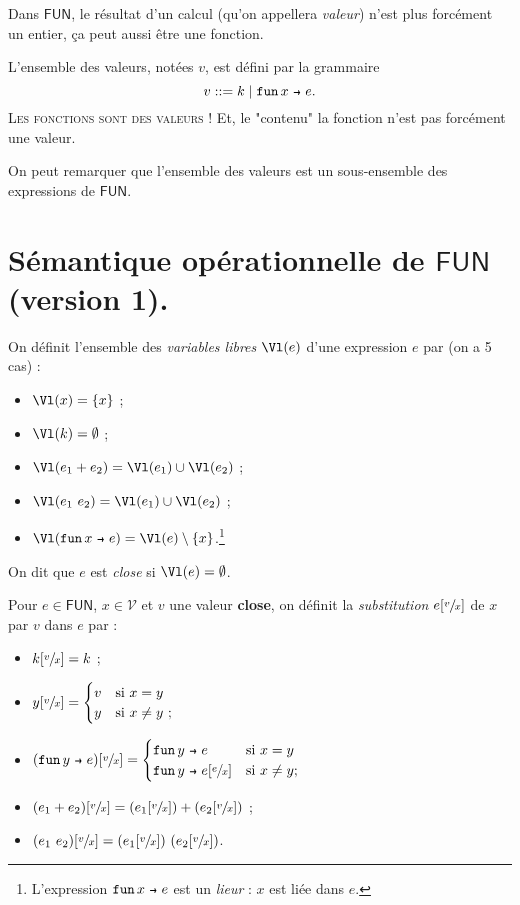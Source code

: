 \documentclass[../main]{subfiles}
\begin{document}
  \begin{rmk}
    Dans $\mathsf{FUN}$, le résultat d'un calcul (qu'on appellera \textit{valeur}) n'est plus forcément un entier, ça peut aussi être une fonction.

    L'ensemble des valeurs, notées $v$, est défini par la grammaire \[
      v ::= k  \mid \fun x e
    .\]
    \textsc{Les fonctions sont des valeurs !} Et, le "contenu" la fonction n'est pas forcément une valeur.

    On peut remarquer que l'ensemble des valeurs est un sous-ensemble des expressions de $\mathsf{FUN}$.
  \end{rmk}

  \section{Sémantique opérationnelle de $\mathsf{FUN}$ (version 1).}

  \begin{defn}
    On définit l'ensemble des \textit{variables libres} $\Vl(e)$ d'une expression $e$ par (on a 5 cas) :
    \begin{itemize}
      \item $\Vl(x) = \{x\}$ ;
      \item $\Vl(k) = \emptyset$ ;
      \item $\Vl(e_1 + e_2) = \Vl(e_1) \cup \Vl(e_2)$ ;
      \item $\Vl(e_1\ e_2) = \Vl(e_1) \cup \Vl(e_2)$ ;
      \item $\Vl(\fun x e) = \Vl(e) \setminus \{x\}$.\footnote{L'expression $\fun x e$ est un \textit{lieur} : $x$ est liée dans $e$.}
    \end{itemize}

    On dit que $e$ est \textit{close} si $\Vl(e) = \emptyset$.
  \end{defn}

  \begin{defn}
    Pour $e \in \mathsf{FUN}$, $x \in \mathcal{V}$ et $v$ une valeur \textbf{close}, on définit la \textit{substitution} $e[\sfrac{v}{x}]$ de $x$ par $v$ dans $e$ par :
    \begin{itemize}
      \item $k[\sfrac{v}{x}] = k$ ;
      \item $y[\sfrac{v}{x}] = \begin{cases}
          v & \text{si}\ x = y\\
          y & \text{si}\ x \neq y\ ;
      \end{cases}$
      \item $(\fun y e)[\sfrac{v}{x}] = \begin{cases}
          \fun y e & \text{si}\ x = y\\
          \fun y e[\sfrac{e}{x}] & \text{si}\ x \neq y ;
      \end{cases}$
      \item $(e_1 + e_2)[\sfrac{v}{x}] = (e_1[\sfrac{v}{x}]) + (e_2[\sfrac{v}{x}])$ ;
      \item $(e_1 \ e_2)[\sfrac{v}{x}] = (e_1[\sfrac{v}{x}]) \ (e_2[\sfrac{v}{x}])$.
    \end{itemize}
  \end{defn}
\end{document}
